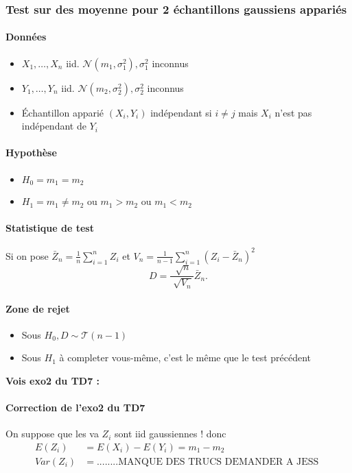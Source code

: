\documentclass{article}
\theoremstyle{plain}%
\theoremstyle{definition}
\theoremstyle{remark}
\begin{document}
\subsubsection{Test sur des moyenne pour 2 échantillons gaussiens appariés}
\paragraph*{Données} \begin{itemize}
    \item $ X_1, \dots, X_n  $ iid. $ \mathcal{N}(m_1, \sigma_1 ^2), \sigma_1^2 $ inconnus
    \item $ Y_1, \dots, Y_n  $ iid. $ \mathcal{N}(m_2, \sigma_2 ^2), \sigma_2^2 $ inconnus
    \item Échantillon apparié $ (X_i, Y_i) $ indépendant si $ i \neq j $ mais $ X_i $ n'est pas indépendant de $ Y_i $ 
\end{itemize}

\paragraph*{Hypothèse}
\begin{itemize}
    \item $ H_0 = m_1 = m_2 $ 
    \item $ H_1 = m_1 \neq m_2 $ ou $ m_1 > m_2 $ ou $ m_1 < m_2 $ 
\end{itemize}

\paragraph*{Statistique de test}
Si on pose $ \bar{Z}_n = \frac{1}{n} \sum_{i=1}^{n}Z_i $ et $ V_n = \frac{1}{n-1}\sum_{i=1}^{n}(Z_i - \bar{Z}_n)^2 $ 
\[
    D = \frac{\sqrt[]{n}}{\sqrt[]{V_n}}\bar{Z}_n
.\]

\paragraph*{Zone de rejet}
\begin{itemize}
    \item Sous $ H_0, D \sim \mathcal{T}(n-1) $
    \item Sous $ H_1 $ à completer vous-même, c'est le même que le test précédent
\end{itemize}

\textbf{Vois exo2 du TD7 : }
\paragraph*{Correction de l'exo2 du TD7} On suppose que les va $ Z_i $ sont iid gaussiennes ! donc \begin{align*}
    E(Z_i) &= E(X_i) - E(Y_i) = m_1 - m_2 \\
    Var(Z_i) &= ........ \text{MANQUE DES TRUCS DEMANDER A JESS }
\end{align*}
\end{document}
